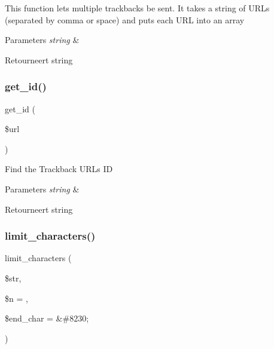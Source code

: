 This function lets multiple trackbacks be sent. It takes a string of U\+R\+Ls (separated by comma or space) and puts each U\+RL into an array


\begin{DoxyParams}{Parameters}
{\em string} & \\
\hline
\end{DoxyParams}
\begin{DoxyReturn}{Retourneert}
string 
\end{DoxyReturn}
\mbox{\label{class_c_i___trackback_a404e345e61e00d5685117a101b5bc71a}} 
\subsubsection{\texorpdfstring{get\_id()}{get\_id()}}
{\footnotesize\ttfamily get\+\_\+id (\begin{DoxyParamCaption}\item[{}]{\$url }\end{DoxyParamCaption})}

Find the Trackback U\+RL\textquotesingle{}s ID


\begin{DoxyParams}{Parameters}
{\em string} & \\
\hline
\end{DoxyParams}
\begin{DoxyReturn}{Retourneert}
string 
\end{DoxyReturn}
\mbox{\label{class_c_i___trackback_a55f0b98881441e99d74c657c3b005f11}} 
\subsubsection{\texorpdfstring{limit\_characters()}{limit\_characters()}}
{\footnotesize\ttfamily limit\+\_\+characters (\begin{DoxyParamCaption}\item[{}]{\$str,  }\item[{}]{\$n = {},  }\item[{}]{\$end\+\_\+char = {\ttfamily \textquotesingle{}\&\#8230;\textquotesingle{}} }\end{DoxyParamCaption})}

